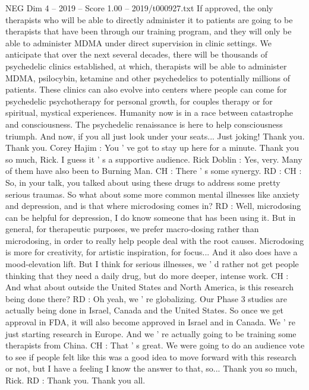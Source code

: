 \begin{textsample}{NEG Dim 4 – 2019 – Score 1.00 – 2019/t000927.txt}
If approved, the only therapists who will be able to directly administer it to patients are going to be therapists that have been through our training program, and they will only be able to administer MDMA under direct supervision in clinic settings.
We anticipate that over the next several decades, there will be thousands of psychedelic clinics established, at which, therapists will be able to administer MDMA, psilocybin, ketamine and other psychedelics to potentially millions of patients.
These clinics can also evolve into centers where people can come for psychedelic psychotherapy for personal growth, for couples therapy or for spiritual, mystical experiences.
Humanity now is in a race between catastrophe and consciousness.
The psychedelic renaissance is here to help consciousness triumph.
And now, if you all just look under your seats...
Just joking!
Thank you.
Thank you.
Corey Hajim : You ' ve got to stay up here for a minute.
Thank you so much, Rick.
I guess it ' s a supportive audience.
Rick Doblin : Yes, very.
Many of them have also been to Burning Man.
CH : There ' s some synergy.
RD : CH : So, in your talk, you talked about using these drugs to address some pretty serious traumas.
So what about some more common mental illnesses like anxiety and depression, and is that where microdosing comes in?
RD : Well, microdosing can be helpful for depression, I do know someone that has been using it.
But in general, for therapeutic purposes, we prefer macro-dosing rather than microdosing, in order to really help people deal with the root causes.
Microdosing is more for creativity, for artistic inspiration, for focus...
And it also does have a mood-elevation lift.
But I think for serious illnesses, we ' d rather not get people thinking that they need a daily drug, but do more deeper, intense work.
CH : And what about outside the United States and North America, is this research being done there?
RD : Oh yeah, we ' re globalizing.
Our Phase 3 studies are actually being done in Israel, Canada and the United States.
So once we get approval in FDA, it will also become approved in Israel and in Canada.
We ' re just starting research in Europe.
And we ' re actually going to be training some therapists from China.
CH : That ' s great.
We were going to do an audience vote to see if people felt like this was a good idea to move forward with this research or not, but I have a feeling I know the answer to that, so...
Thank you so much, Rick.
RD : Thank you.
Thank you all.

\end{textsample}
